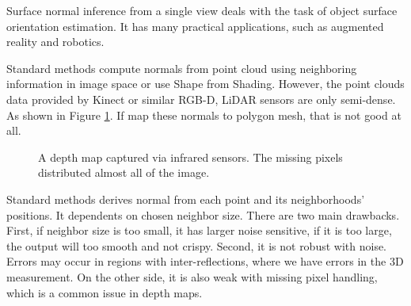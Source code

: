 Surface normal inference from a single view deals with the task of object surface orientation estimation. It has many practical applications, such as augmented reality and robotics. 





Standard methods compute normals from point cloud using neighboring information in image space or use Shape from Shading. However, the point clouds data provided by Kinect or similar RGB-D, LiDAR sensors are only semi-dense. As shown in Figure \ref{fig:depth_map_with_noise}. If map these normals to polygon mesh, that is not good at all. 

\begin{figure}[!h]
	\centering
	\caption{A depth map captured via infrared sensors. The missing pixels distributed almost all of the image.}
	\label{fig:depth_map_with_noise}
\end{figure}

Standard methods derives normal from each point and its neighborhoods' positions. It dependents on chosen neighbor size. There are two main drawbacks. First, if neighbor size is too small, it has larger noise sensitive, if it is too large, the output will too smooth and not crispy. Second, it is not robust with noise.  Errors may occur in regions with inter-reflections, where we have errors in the 3D measurement. On the other side, it is also weak with missing pixel handling, which is a common issue in depth maps.

